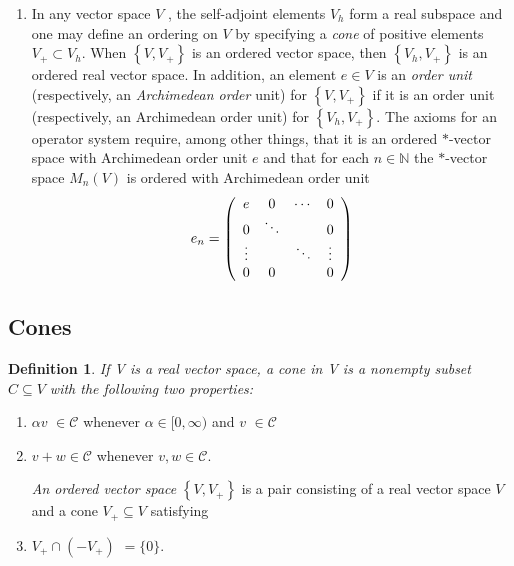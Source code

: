 \documentclass[aps,preprint]{revtex4}%
\newtheorem{definition}[theorem]{Definition}
\begin{document}
\begin{enumerate}
\item[a] In any vector space $V$ , the self-adjoint elements $V_{h}$ form a
real subspace and one may define an ordering on $V$ by specifying a
\emph{cone} of positive elements $V_{+}\subset V_{h}$. When $\left\{
V,V_{+}\right\}  $ is an ordered vector space, then $\left\{  V_{h}%
,V_{+}\right\}  $ is an ordered real vector space. In addition, an element
$e\in V$ is an \emph{order unit} (respectively, an \emph{Archimedean order}
unit) for $\left\{  V,V_{+}\right\}  $ if it is an order unit (respectively,
an Archimedean order unit) for $\left\{  V_{h},V_{+}\right\}  $. The axioms
for an operator system require, among other things, that it is an ordered
$\ast$-vector space with Archimedean order unit $e$ and that for each
$n\in\mathbb{N}$ the $\ast$-vector space $M_{n}(V)$ is ordered with
Archimedean order unit
\begin{equation}
e_{n}=\left(
\begin{array}
[c]{cccc}%
e & 0 & \cdots & 0\\
0 & \ddots &  & 0\\
\vdots &  & \ddots & \vdots\\
0 & 0 &  & 0
\end{array}
\right)
\end{equation}

\end{enumerate}

\subsection{Cones}

\begin{definition}
If V is a real vector space, a cone in V is a nonempty subset $C\subseteq V$
with the following two properties:
\end{definition}

\begin{enumerate}
\item $\alpha v$ $\in\mathcal{C}$ whenever $\alpha\in\lbrack0,\infty)$ and $v$
$\in\mathcal{C}$

\item $v+w\in\mathcal{C}$ whenever $v,w\in\mathcal{C}$.

\emph{An ordered vector space} $\left\{  V,V_{+}\right\}  $ is a pair
consisting of a real vector space $V$ and a cone $V_{+}\subseteq V$ satisfying

\item  $V_{+}\cap\left(  -V_{+}\right)  $ $=\{0\}$.
\end{enumerate}
\end{document}
